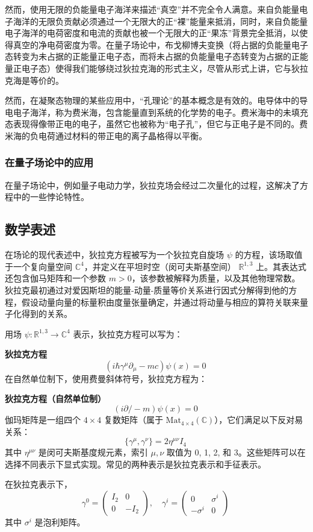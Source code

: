 然而，使用无限的负能量电子海洋来描述“真空”并不完全令人满意。来自负能量电子海洋的无限负贡献必须通过一个无限大的正“裸”能量来抵消，同时，来自负能量电子海洋的电荷密度和电流的贡献也被一个无限大的正“果冻”背景完全抵消，以使得真空的净电荷密度为零。在量子场论中，布戈柳博夫变换（将占据的负能量电子态转变为未占据的正能量正电子态，而将未占据的负能量电子态转变为占据的正能量正电子态）使得我们能够绕过狄拉克海的形式主义，尽管从形式上讲，它与狄拉克海是等价的。

然而，在凝聚态物理的某些应用中，“孔理论”的基本概念是有效的。电导体中的导电电子海洋，称为费米海，包含能量直到系统的化学势的电子。费米海中的未填充态表现得像带正电的电子，虽然它也被称为“电子孔”，但它与正电子是不同的。费米海的负电荷通过材料的带正电的离子晶格得以平衡。
\subsubsection{在量子场论中的应用}
在量子场论中，例如量子电动力学，狄拉克场会经过二次量化的过程，这解决了方程中的一些悖论特性。
\subsection{数学表述}
在场论的现代表述中，狄拉克方程被写为一个狄拉克自旋场 \( \psi \) 的方程，该场取值于一个复向量空间 \( \mathbb{C}^4 \)，并定义在平坦时空（闵可夫斯基空间） \( \mathbb{R}^{1,3} \) 上。其表达式还包含伽马矩阵和一个参数 \( m > 0 \)，该参数被解释为质量，以及其他物理常数。狄拉克最初通过对爱因斯坦的能量-动量-质量等价关系进行因式分解得到他的方程，假设动量向量的标量积由度量张量确定，并通过将动量与相应的算符关联来量子化得到的关系。

用场 \( \psi : \mathbb{R}^{1,3} \rightarrow \mathbb{C}^4 \) 表示，狄拉克方程可以写为：

\textbf{狄拉克方程}  
\[
(i\hbar \gamma^\mu \partial_\mu - mc)\psi(x) = 0~
\]
在自然单位制下，使用费曼斜体符号，狄拉克方程为：

\textbf{狄拉克方程（自然单位制）}  
\[
(i \partial \!\!\!/- m)\psi(x) = 0~
\]
伽玛矩阵是一组四个 \( 4 \times 4 \) 复数矩阵（属于 \( \text{Mat}_{4 \times 4}(\mathbb{C}) \)），它们满足以下反对易关系：
\[
\{\gamma^\mu, \gamma^\nu\} = 2 \eta^{\mu \nu} I_4~
\]
其中 \( \eta^{\mu \nu} \) 是闵可夫斯基度规元素，索引 \( \mu, \nu \) 取值为 0, 1, 2, 和 3。这些矩阵可以在选择不同表示下显式实现。常见的两种表示是狄拉克表示和手征表示。

在狄拉克表示下，
\[
\gamma^0 = \begin{pmatrix} I_2 & 0 \\ 0 & -I_2 \end{pmatrix}, \quad \gamma^i = \begin{pmatrix} 0 & \sigma^i \\ -\sigma^i & 0 \end{pmatrix}~
\]
其中 \( \sigma^i \) 是泡利矩阵。


